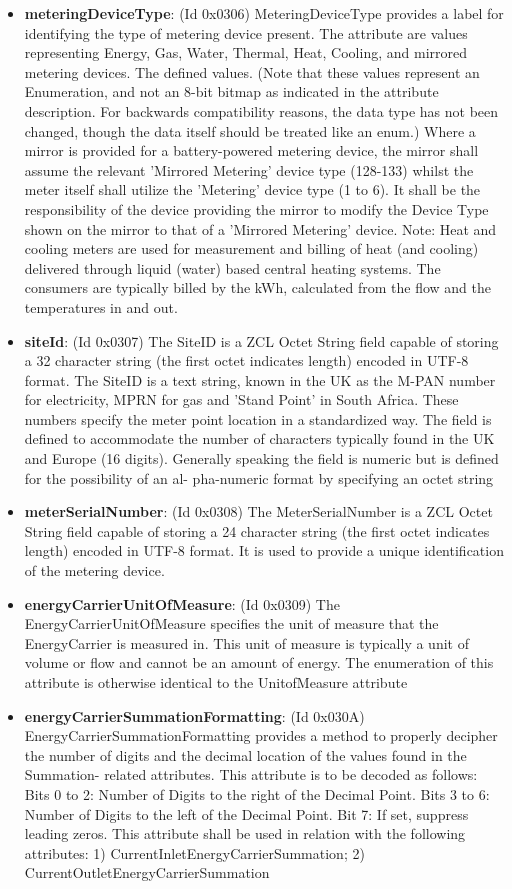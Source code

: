\begin{itemize}
\item \textbf{meteringDeviceType}: (Id 0x0306) MeteringDeviceType provides a label for identifying the type of metering device present. The attribute are values representing Energy, Gas, Water, Thermal, Heat, Cooling, and mirrored metering devices. The defined values. (Note that these values represent an Enumeration, and not an 8-bit bitmap as indicated in the attribute description. For backwards compatibility reasons, the data type has not been changed, though the data itself should be treated like an enum.) Where a mirror is provided for a battery-powered metering device, the mirror shall assume the relevant 'Mirrored Metering' device type (128-133) whilst the meter itself shall utilize the 'Metering' device type (1 to 6). It shall be the responsibility of the device providing the mirror to modify the Device Type shown on the mirror to that of a 'Mirrored Metering' device. Note: Heat and cooling meters are used for measurement and billing of heat (and cooling) delivered through liquid (water) based central heating systems. The consumers are typically billed by the kWh, calculated from the flow and the temperatures in and out.
\item \textbf{siteId}: (Id 0x0307) The SiteID is a ZCL Octet String field capable of storing a 32 character string (the first octet indicates length) encoded in UTF-8 format. The SiteID is a text string, known in the UK as the M-PAN number for electricity, MPRN for gas and 'Stand Point' in South Africa. These numbers specify the meter point location in a standardized way. The field is defined to accommodate the number of characters typically found in the UK and Europe (16 digits). Generally speaking the field is numeric but is defined for the possibility of an al- pha-numeric format by specifying an octet string
\item \textbf{meterSerialNumber}: (Id 0x0308) The MeterSerialNumber is a ZCL Octet String field capable of storing a 24 character string (the first octet indicates length) encoded in UTF-8 format. It is used to provide a unique identification of the metering device.
\item \textbf{energyCarrierUnitOfMeasure}: (Id 0x0309) The EnergyCarrierUnitOfMeasure specifies the unit of measure that the EnergyCarrier is measured in. This unit of measure is typically a unit of volume or flow and cannot be an amount of energy. The enumeration of this attribute is otherwise identical to the UnitofMeasure attribute
\item \textbf{energyCarrierSummationFormatting}: (Id 0x030A) EnergyCarrierSummationFormatting provides a method to properly decipher the number of digits and the decimal location of the values found in the Summation- related attributes. This attribute is to be decoded as follows: Bits 0 to 2: Number of Digits to the right of the Decimal Point. Bits 3 to 6: Number of Digits to the left of the Decimal Point. Bit 7: If set, suppress leading zeros. This attribute shall be used in relation with the following attributes: 1) CurrentInletEnergyCarrierSummation; 2) CurrentOutletEnergyCarrierSummation

\end{itemize}

